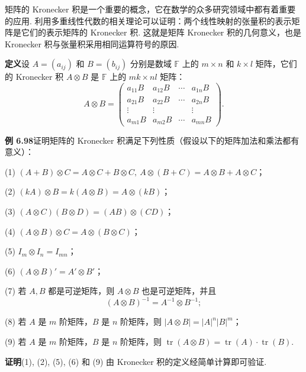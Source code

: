 \documentclass[UTF8,12pt,a4paper,fontset=fandol]{ctexart}
\begin{document}
矩阵的 Kronecker 积是一个重要的概念，它在数学的众多研究领域中都有着重要的应用. 利用多重线性代数的相关理论可以证明：两个线性映射的张量积的表示矩阵是它们的表示矩阵的 Kronecker 积. 这就是矩阵 Kronecker 积的几何意义，也是 Kronecker 积与张量积采用相同运算符号的原因.

\noindent\textbf{定义}\quad 设 $A=(a_{ij})$ 和 $B=(b_{ij})$ 分别是数域 $\mathbb{F}$ 上的 $m\times n$ 和 $k\times l$ 矩阵，它们的 Kronecker 积 $A\otimes B$ 是 $\mathbb{F}$ 上的 $mk\times nl$ 矩阵：
\[
A\otimes B=
\begin{pmatrix}
a_{11}B&a_{12}B&\cdots&a_{1n}B\\
a_{21}B&a_{22}B&\cdots&a_{2n}B\\
\vdots&\vdots&&\vdots\\
a_{m1}B&a_{m2}B&\cdots&a_{mn}B
\end{pmatrix}.
\]

\noindent\textbf{例 6.98}\quad 证明矩阵的 Kronecker 积满足下列性质（假设以下的矩阵加法和乘法都有意义）：

(1) $(A+B)\otimes C=A\otimes C+B\otimes C,\ A\otimes(B+C)=A\otimes B+A\otimes C$；

(2) $(kA)\otimes B=k(A\otimes B)=A\otimes(kB)$；

(3) $(A\otimes C)(B\otimes D)=(AB)\otimes(CD)$；

(4) $(A\otimes B)\otimes C=A\otimes(B\otimes C)$；

(5) $I_m\otimes I_n=I_{mn}$；

(6) $(A\otimes B)'=A'\otimes B'$；

(7) 若 $A,B$ 都是可逆矩阵，则 $A\otimes B$ 也是可逆矩阵，并且
\[
(A\otimes B)^{-1}=A^{-1}\otimes B^{-1};
\]

(8) 若 $A$ 是 $m$ 阶矩阵，$B$ 是 $n$ 阶矩阵，则 $|A\otimes B|=|A|^n|B|^m$；

(9) 若 $A$ 是 $m$ 阶矩阵，$B$ 是 $n$ 阶矩阵，则 $\operatorname{tr}(A\otimes B)=\operatorname{tr}(A)\cdot\operatorname{tr}(B)$.

\noindent\textbf{证明}\quad (1), (2), (5), (6) 和 (9) 由 Kronecker 积的定义经简单计算即可验证.
\end{document}
